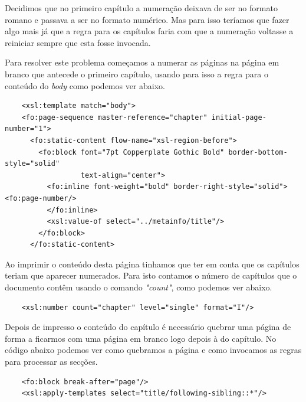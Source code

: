 \documentclass[a4paper]{article}
\begin{document}
\hspace{1cm}Decidimos que no primeiro capítulo a numeração deixava de ser no formato romano e passava a ser no formato numérico. Mas para isso teríamos que fazer algo mais já que a regra para os capítulos faria com que a numeração voltasse a reiniciar sempre que esta fosse invocada.

\hspace{1cm}Para resolver este problema começamos a numerar as páginas na página em branco que antecede o primeiro capítulo, usando para isso a regra para o conteúdo do \emph{body} como podemos ver abaixo.\\

\begin{small}
\begin{lstlisting}
    <xsl:template match="body">
    <fo:page-sequence master-reference="chapter" initial-page-number="1">
      <fo:static-content flow-name="xsl-region-before">
        <fo:block font="7pt Copperplate Gothic Bold" border-bottom-style="solid"
                  text-align="center">
          <fo:inline font-weight="bold" border-right-style="solid"><fo:page-number/>
          </fo:inline>
          <xsl:value-of select="../metainfo/title"/>
        </fo:block>
      </fo:static-content>
\end{lstlisting}
\end{small}

\hspace{1cm}Ao imprimir o conteúdo desta página tinhamos que ter em conta que os capítulos teriam que aparecer numerados. Para isto contamos o número de capítulos que o documento contêm usando o comando \emph{"count"}, como podemos ver abaixo.\\

\begin{small}
\begin{lstlisting}
    <xsl:number count="chapter" level="single" format="I"/>
\end{lstlisting}
\end{small}

\hspace{1cm}Depois de impresso o conteúdo do capítulo é necessário quebrar uma página de forma a ficarmos com uma página em branco logo depois à do capítulo. No código abaixo podemos ver como quebramos a página e como invocamos as regras para processar as secções.\\

\begin{small}
\begin{lstlisting}
    <fo:block break-after="page"/>
    <xsl:apply-templates select="title/following-sibling::*"/>
\end{lstlisting}
\end{small}
  
\end{document}
